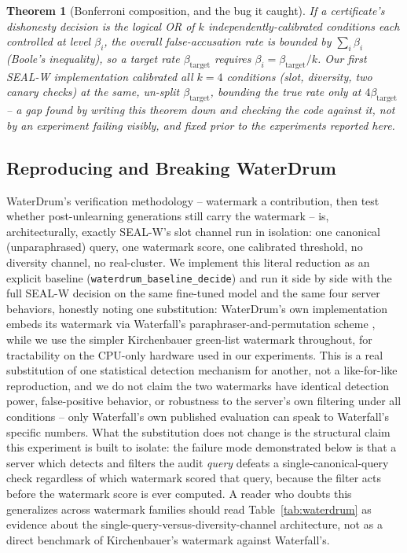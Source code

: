 \documentclass[10pt,journal,compsoc]{IEEEtran}
\newtheorem{theorem}{Theorem}
\begin{document}
\begin{theorem}[Bonferroni composition, and the bug it caught]
\label{thm:bonferroni}
If a certificate's dishonesty decision is the logical OR of $k$ independently-calibrated conditions each controlled at level $\beta_i$, the overall false-accusation rate is bounded by $\sum_i \beta_i$ (Boole's inequality), so a target rate $\beta_{\text{target}}$ requires $\beta_i = \beta_{\text{target}}/k$. Our first SEAL-W implementation calibrated all $k{=}4$ conditions (slot, diversity, two canary checks) at the same, un-split $\beta_{\text{target}}$, bounding the true rate only at $4\beta_{\text{target}}$ -- a gap found by writing this theorem down and checking the code against it, not by an experiment failing visibly, and fixed prior to the experiments reported here.
\end{theorem}

\subsection{Reproducing and Breaking WaterDrum}
\label{sec:waterdrum-comparison}

WaterDrum's verification methodology -- watermark a contribution, then test whether post-unlearning generations still carry the watermark -- is, architecturally, exactly SEAL-W's slot channel run in isolation: one canonical (unparaphrased) query, one watermark score, one calibrated threshold, no diversity channel, no real-cluster. We implement this literal reduction as an explicit baseline (\texttt{waterdrum\_baseline\_decide}) and run it side by side with the full SEAL-W decision on the same fine-tuned model and the same four server behaviors, honestly noting one substitution: WaterDrum's own implementation embeds its watermark via Waterfall's paraphraser-and-permutation scheme \cite{lau2024waterfall}, while we use the simpler Kirchenbauer green-list watermark \cite{kirchenbauer2023watermark} throughout, for tractability on the CPU-only hardware used in our experiments. This is a real substitution of one statistical detection mechanism for another, not a like-for-like reproduction, and we do not claim the two watermarks have identical detection power, false-positive behavior, or robustness to the server's own filtering under all conditions -- only Waterfall's own published evaluation can speak to Waterfall's specific numbers. What the substitution does not change is the structural claim this experiment is built to isolate: the failure mode demonstrated below is that a server which detects and filters the audit \emph{query} defeats a single-canonical-query check regardless of which watermark scored that query, because the filter acts before the watermark score is ever computed. A reader who doubts this generalizes across watermark families should read Table~\ref{tab:waterdrum} as evidence about the single-query-versus-diversity-channel architecture, not as a direct benchmark of Kirchenbauer's watermark against Waterfall's.
\end{document}
